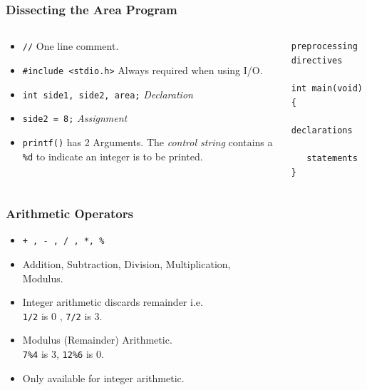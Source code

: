 \begin{frame}[fragile]
\frametitle{Dissecting the Area Program}

\begin{columns}
\begin{column}{0.45\textwidth}
\begin{itemize}[<+->]
\item \verb^//^ One line comment.
\item \verb^#include <stdio.h>^ Always required when using I/O.
\item \verb^int side1, side2, area;^ {\it Declaration}
\item \verb^side2 = 8;^ {\it  Assignment }
\item \verb^printf()^ has 2 Arguments.
The {\it control string}
contains a \verb+%d+ to indicate an integer is to be printed.
\end{itemize}
\end{column}

\begin{column}{0.45\textwidth}
\begin{lstlisting}[style=basicc]
preprocessing directives

int main(void)
{
   declarations

   statements
}
\end{lstlisting}
\end{column}

\end{columns}
\end{frame}




\begin{frame}[fragile]
\frametitle{Arithmetic Operators}

\begin{itemize}[<+->]
\item \verb^+ , - , / , *, %^
\item Addition, Subtraction, Division, Multiplication,\\ Modulus.
\item Integer arithmetic discards remainder i.e.\\
\verb+1/2+ is 0 , \verb+7/2+ is 3.
\item Modulus (Remainder) Arithmetic.\\
\verb+7%4+ is 3, \verb+12%6+ is 0.

\item
Only available for integer arithmetic.
\end{itemize}
\end{frame}



